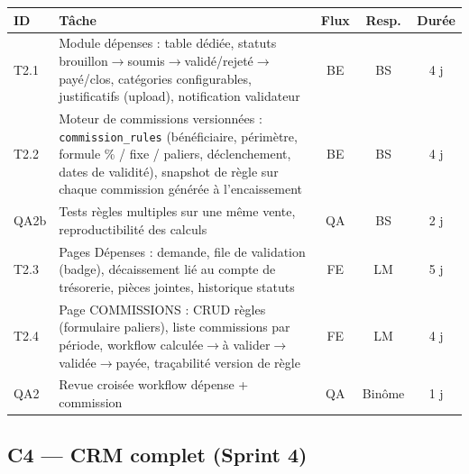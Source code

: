 \documentclass[11pt,a4paper]{article}
\begin{document}
\begin{tabularx}{\textwidth}{|l|Y|c|c|c|}
\hline
{}\textbf{ID} & \textbf{Tâche} & \textbf{Flux} & \textbf{Resp.} & \textbf{Durée} \\ \hline
T2.1 & Module dépenses : table dédiée, statuts brouillon$\rightarrow$soumis$\rightarrow$validé/rejeté$\rightarrow$payé/clos, catégories configurables, justificatifs (upload), notification validateur & BE & BS & 4 j \\ \hline
T2.2 & Moteur de commissions versionnées : \texttt{commission\_rules} (bénéficiaire, périmètre, formule \% / fixe / paliers, déclenchement, dates de validité), snapshot de règle sur chaque commission générée à l'encaissement & BE & BS & 4 j \\ \hline
QA2b & Tests règles multiples sur une même vente, reproductibilité des calculs & QA & BS & 2 j \\ \hline
T2.3 & Pages Dépenses : demande, file de validation (badge), décaissement lié au compte de trésorerie, pièces jointes, historique statuts & FE & LM & 5 j \\ \hline
T2.4 & Page COMMISSIONS : CRUD règles (formulaire paliers), liste commissions par période, workflow calculée$\rightarrow$à valider$\rightarrow$validée$\rightarrow$payée, traçabilité version de règle & FE & LM & 4 j \\ \hline
QA2 & Revue croisée workflow dépense + commission & QA & Binôme & 1 j \\ \hline
\end{tabularx}

\subsection{C4 --- CRM complet (Sprint 4)}
\end{document}
